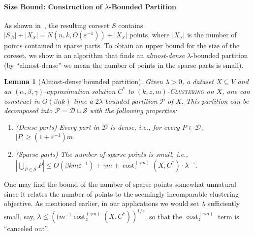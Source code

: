 \documentclass[letterpaper,11pt]{article}
\theoremstyle{plain}
\newtheorem{lemma}[theorem]{Lemma}
\theoremstyle{definition}
\theoremstyle{remark}
\DeclareMathOperator{\cost}{cost}
\newcommand{\eps}{\varepsilon}
\newcommand{\calD}{\mathcal{D}}
\newcommand{\calP}{\mathcal{P}}
\newcommand{\calS}{\mathcal{S}}
\newcommand{\ProblemName}[1]{\textsc{#1}}
\newcommand{\kzmC}{\ProblemName{$(k,z,m)$-Clustering}\xspace}
\begin{document}
\paragraph{Size Bound: Construction of $\lambda$-Bounded Partition}
As shown in~, the resulting coreset $S$ contains $|S_{\calD}| + |X_{\calS}| = N(n,k,O(\eps^{-1})) + |X_{\calS}|$ points, where $|X_{\calS}|$ is the number of points contained in sparse parts. 
To obtain an upper bound for the size of the coreset, we show in  an algorithm that finds an \emph{almost-dense} $\lambda$-bounded partition (by ``almost-dense'' we mean the number of points in the sparse parts is small).

\begin{lemma}[Almost-dense bounded partition]
    \label{lem:decomposition}
Given $\lambda>0$, a dataset $X \subseteq V$ and an $(\alpha,\beta,\gamma)$-approximation solution $C^*$ to \kzmC on $X$, one can construct in $\tilde O(\beta n k)$ time a $2\lambda$-bounded partition $\calP$ of $X$. This partition can be decomposed into $\calP = \calD \cup \calS$ with the following properties:
    \begin{enumerate}
        \item  (Dense parts) Every part in $\calD$ is dense, i.e., for every $P\in\calD$, $|P|\ge (1+\eps^{-1})m$.
        \item  (Sparse parts) The number of sparse points is small, i.e., $|\bigcup_{P\in\calS} P|\le O(\beta k m\eps^{-1}) + \gamma m + \cost_z^{(\gamma m)}(X,C^*)\cdot \lambda^{-z}$. 
    \end{enumerate}

\end{lemma}


One may find the bound of the number of sparse points somewhat unnatural since it relates the number of points to the seemingly incomparable clustering objective. As mentioned earlier, in our applications we would set $\lambda$ sufficiently small, say, $\lambda \le \left((m^{-1}\cost_z^{(\gamma m)}(X,C^*)\right)^{1/z}$, so that the $\cost_z^{(\gamma m)}$ term is ``canceled out''.
\end{document}
